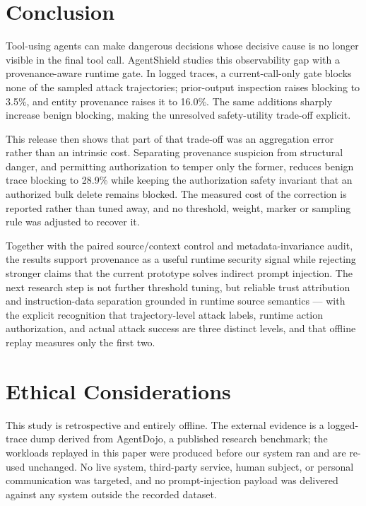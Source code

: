 \documentclass[letterpaper,twocolumn,10pt]{article}
\begin{document}
\section{Conclusion}
\label{sec:conclusion}

Tool-using agents can make dangerous decisions whose decisive cause is no longer
visible in the final tool call. AgentShield studies this observability gap with
a provenance-aware runtime gate. In logged traces, a current-call-only gate
blocks none of the sampled attack trajectories; prior-output inspection raises
blocking to 3.5\%, and entity provenance raises it to 16.0\%. The same additions
sharply increase benign blocking, making the unresolved safety-utility trade-off
explicit.

This release then shows that part of that trade-off was an aggregation error
rather than an intrinsic cost. Separating provenance suspicion from structural
danger, and permitting authorization to temper only the former, reduces benign
trace blocking to 28.9\% while keeping the authorization safety invariant that
an authorized bulk delete remains blocked. The measured cost of the correction
is reported rather than tuned away, and no threshold, weight, marker or sampling
rule was adjusted to recover it.

Together with the paired source/context control and metadata-invariance audit,
the results support provenance as a useful runtime security signal while
rejecting stronger claims that the current prototype solves indirect prompt
injection. The next research step is not further threshold tuning, but reliable
trust attribution and instruction-data separation grounded in runtime source
semantics --- with the explicit recognition that trajectory-level attack labels,
runtime action authorization, and actual attack success are three distinct
levels, and that offline replay measures only the first two.

\cleardoublepage
\appendix
\section*{Ethical Considerations}

This study is retrospective and entirely offline. The external evidence is a
logged-trace dump derived from AgentDojo, a published research benchmark; the
workloads replayed in this paper were produced before our system ran and are
re-used unchanged. No live system, third-party service, human subject, or
personal communication was targeted, and no prompt-injection payload was
delivered against any system outside the recorded dataset.
\end{document}
